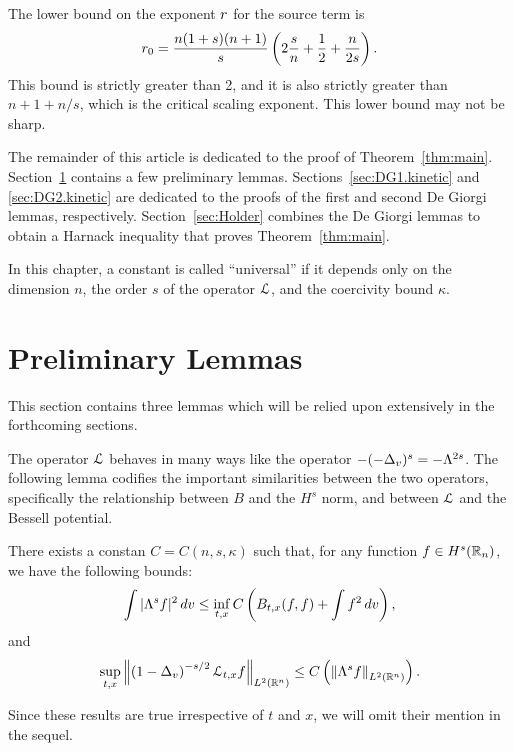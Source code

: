 The lower bound on the exponent ${r}$ for the source term is
\[ {r}_0 = \frac{n (1+s) (n+1)}{s} \left( 2 \frac{s}{n} + \frac{1}{2} + \frac{n}{2s} \right). \]
This bound is strictly greater than 2, and it is also strictly greater than $n+1+n/s$, which is the critical scaling exponent.  This lower bound may not be sharp.   

The remainder of this article is dedicated to the proof of Theorem~\ref{thm:main}.  Section~\ref{sec:preliminaries} contains a few preliminary lemmas.  Sections~\ref{sec:DG1.kinetic} and \ref{sec:DG2.kinetic} are dedicated to the proofs of the first and second De Giorgi lemmas, respectively.  Section~\ref{sec:Holder} combines the De Giorgi lemmas to obtain a Harnack inequality that proves Theorem~\ref{thm:main}.  

In this chapter, a constant is called ``universal'' if it depends only on the dimension $n$, the order $s$ of the operator $\mathcal{L}$, and the coercivity bound $\kappa$.  




\section{Preliminary Lemmas} \label{sec:preliminaries}

This section contains three lemmas which will be relied upon extensively in the forthcoming sections.  

The operator $\mathcal{L}$ behaves in many ways like the operator $-(-\Delta_v)^{s} = - \Lambda^{2s}$.  The following lemma codifies the important similarities between the two operators, specifically the relationship between $B$ and the $H^s$ norm, and between $\mathcal{L}$ and the Bessell potential.  
\begin{lemma} \label{thm:B_and_Hs}
There exists a constan $C = C(n,s,\kappa)$ such that, for any function $f \in H^s(\mathbb{R}_n)$, we have the following bounds:
\[ \int |\Lambda^s f|^2 \,dv \leq \inf_{t,x} C\left( B_{t,x}(f,f) + \int f^2 \,dv \right), \]
and
\[ \sup_{t,x} \left\lVert\left( 1-\Delta_v \right)^{-s/2} \mathcal{L}_{t,x} f\right\rVert_{ L^2(\mathbb{R}^n) } \leq C \left(  \left\lVert\Lambda^s f\right\rVert_{L^2(\mathbb{R}^n)} \right). \]

\end{lemma}

Since these results are true irrespective of $t$ and $x$, we will omit their mention in the sequel.  


